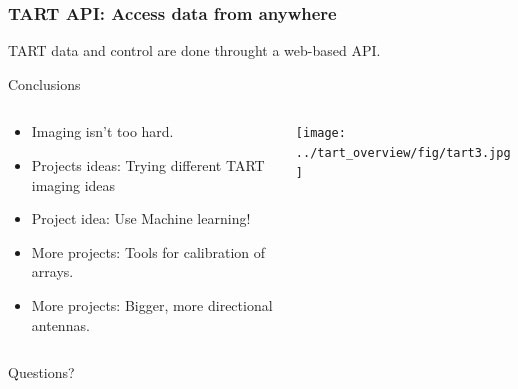 \documentclass[ignorenonframetext]{beamer}
\begin{document}
\begin{frame}[containsverbatim]
\frametitle{TART API: Access data from anywhere}
TART data and control are done throught a web-based API.

%
%

\end{frame}

\begin{frame}{Conclusions}
 \begin{columns}
  \begin{column}{0.6\linewidth}
    \begin{itemize}
    \item Imaging isn't too hard.
    \item Projects ideas: Trying different TART imaging ideas
    \item Project idea: Use Machine learning!
    \item More projects: Tools for calibration of arrays.
    \item More projects: Bigger, more directional antennas.
    \end{itemize}
  \end{column}
  \begin{column}{0.4\linewidth}
    \texttt{[image: ../tart\_overview/fig/tart3.jpg]}
  \end{column}
\end{columns}
    \begin{block}{}
     \begin{center} Questions? \end{center}
    \end{block}

\end{frame}
\end{document}
